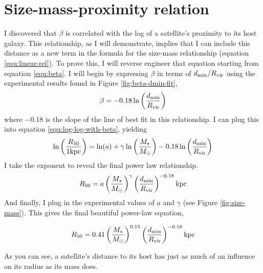 
\section{Size-mass-proximity relation}

I discovered that $\beta$ is correlated with the log of a satellite's proximity to its host galaxy. This relationship, as I will demonstrate, implies that I can include this distance as a new term in the formula for the size-mass relationship (equation \ref{equ:linear-rel}). To prove this, I will reverse engineer that equation starting from equation \ref{equ:beta}. I will begin by expressing $\beta$ in terms of $d_{\rm{min}} / R_{\rm{vir}}$ using the experimental results found in Figure \ref{fig:beta-dmin-fit},
\begin{equation}
    \beta = -0.18 \ln\left( \frac{d_{\rm{min}}}{R_{\rm{vir}}} \right)
\end{equation}
where $-0.18$ is the slope of the line of best fit in this relationship. I can plug this into equation \ref{equ:log-log-with-beta}, yielding
\begin{equation}
    \ln \left(
        \frac{R_{50}}{1 \rm{ kpc}}
    \right)
    =
    \ln(a)
    + \gamma \ln \left(
        \frac{M_\star}{M_\odot}
    \right)
    -0.18 \ln\left( \frac{d_{\rm{min}}}{R_{\rm{vir}}} \right)
\end{equation}
I take the exponent to reveal the final power law relationship.
\begin{equation}
    R_{50} = a
    \left( \frac{M_\star}{M_\odot} \right)^\gamma
    \left( \frac{d_{\rm{min}}}{R_{\rm{vir}}} \right)^{-0.18}
    \text{kpc}
\end{equation}
And finally, I plug in the experimental values of $a$ and $\gamma$ (see Figure \ref{fig:size-mass}). This gives the final beautiful power-law equation,

\begin{equation}
    R_{50} = 0.41
    \left( \frac{M_\star}{M_\odot} \right)^{0.15}
    \left( \frac{d_{\rm{min}}}{R_{\rm{vir}}} \right)^{-0.18}
    \text{kpc}
\end{equation}

As you can see, a satellite's distance to its host has just as much of an influence on its radius as its mass does. 



